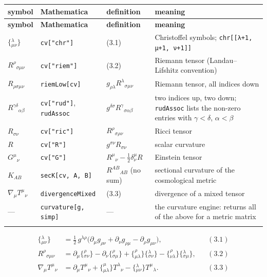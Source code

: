 \documentclass[10pt,a4paper]{article}
\begin{document}
{\small
\begin{longtable}{>{\raggedright\arraybackslash}p{}>{\raggedright\arraybackslash}p{}>{\raggedright\arraybackslash}p{}>{\raggedright\arraybackslash}p{}}
\toprule
\textbf{symbol} & \textbf{Mathematica} & \textbf{definition} & \textbf{meaning} \\
\midrule\endfirsthead
\toprule
\textbf{symbol} & \textbf{Mathematica} & \textbf{definition} & \textbf{meaning} \\
\midrule\endhead
\endfoot
\bottomrule\endlastfoot
$\{{}^{\lambda}_{\mu\nu}\}$ & \texttt{cv["chr"]} & (3.1) & Christoffel symbols; \texttt{chr[[λ+1, μ+1, ν+1]]} \\
$R^\rho{}_{\sigma\mu\nu}$ & \texttt{cv["riem"]} & (3.2) & Riemann tensor (Landau–Lifshitz convention) \\
$R_{\rho\sigma\mu\nu}$ & \texttt{riemLow[cv]} & $g_{\rho\lambda}R^\lambda{}_{\sigma\mu\nu}$ & Riemann tensor, all indices down \\
$R^{\gamma\delta}{}_{\alpha\beta}$ & \texttt{cv["rud"]}, \texttt{rudAssoc} & $g^{\delta\sigma}R^\gamma{}_{\sigma\alpha\beta}$ & two indices up, two down; \texttt{rudAssoc} lists the non-zero entries with $\gamma<\delta$, $\alpha<\beta$ \\
$R_{\sigma\nu}$ & \texttt{cv["ric"]} & $R^\rho{}_{\sigma\rho\nu}$ & Ricci tensor \\
$R$ & \texttt{cv["R"]} & $g^{\sigma\nu}R_{\sigma\nu}$ & scalar curvature \\
$G^\mu{}_\nu$ & \texttt{cv["G"]} & $R^\mu{}_\nu-\tfrac12\delta^\mu_\nu R$ & Einstein tensor \\
$K_{AB}$ & \texttt{secK[cv, A, B]} & $R^{AB}{}_{AB}$ (no sum) & sectional curvature of the cosmological metric \\
$\nabla_\mu T^\mu{}_\nu$ & \texttt{divergenceMixed} & (3.3) & divergence of a mixed tensor \\
— & \texttt{curvature[g, simp]} & — & the curvature engine: returns all of the above for a metric matrix \\*
\end{longtable}}
\begin{align*}
\{{}^{\lambda}_{\mu\nu}\}&=\tfrac12\,g^{\lambda\rho}\big(\partial_\mu g_{\rho\nu}+\partial_\nu g_{\rho\mu}-\partial_\rho g_{\mu\nu}\big),&&(3.1) \\
R^{\rho}{}_{\sigma\mu\nu}&=\partial_\mu\{{}^{\rho}_{\sigma\nu}\}-\partial_\nu\{{}^{\rho}_{\sigma\mu}\}+\{{}^{\rho}_{\mu\lambda}\}\{{}^{\lambda}_{\sigma\nu}\}-\{{}^{\rho}_{\nu\lambda}\}\{{}^{\lambda}_{\sigma\mu}\},&&(3.2) \\
\nabla_\mu T^\mu{}_\nu&=\partial_\mu T^\mu{}_\nu+\{{}^{\mu}_{\mu\lambda}\}T^\lambda{}_\nu-\{{}^{\lambda}_{\mu\nu}\}T^\mu{}_\lambda .&&(3.3)
\end{align*}
\end{document}
